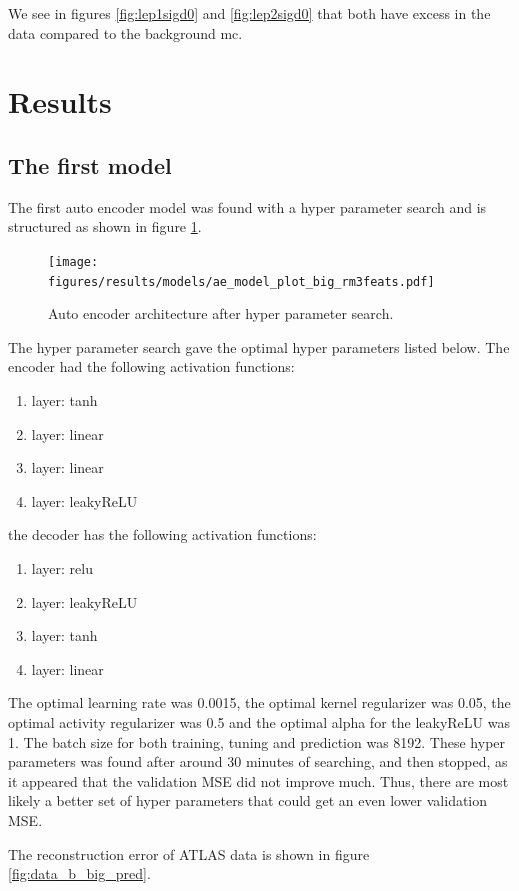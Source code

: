 \documentclass[ reprint, amsmath,amssymb, aps, nofootinbib]{revtex4-2}
\begin{document}
We see in figures \ref{fig:lep1sigd0} and \ref{fig:lep2sigd0} that both have excess in the data compared to the background mc. 

\newpage
\section{Results}

\subsection{The first model}

The first auto encoder model was found with a hyper parameter search and is structured as shown in figure \ref{fig:big_ae_plot}. 

\begin{figure}[H]
    \centering
    \texttt{[image: figures/results/models/ae\_model\_plot\_big\_rm3feats.pdf]}
    \caption{Auto encoder architecture after hyper parameter search. }
    \label{fig:big_ae_plot}
\end{figure}
The hyper parameter search gave the optimal hyper parameters listed below. The encoder had the following activation functions:
\begin{enumerate}
    \item layer: tanh
    \item layer: linear
    \item layer: linear
    \item layer: leakyReLU
\end{enumerate}

the decoder has the following activation functions: 
\begin{enumerate}
    \item layer: relu
    \item layer: leakyReLU
    \item layer: tanh
    \item layer: linear
\end{enumerate}


The optimal learning rate was 0.0015, the optimal kernel regularizer was 0.05, the optimal activity regularizer was 0.5 and the optimal alpha for the leakyReLU was 1. The batch size for both training, tuning and prediction was 8192. These hyper parameters was found after around 30 minutes of searching, and then stopped, as it appeared that the validation MSE did not improve much. Thus, there are most likely a better set of hyper parameters that could get an even lower validation MSE. \par 
The reconstruction error of ATLAS data is shown in figure \ref{fig:data_b_big_pred}.
\end{document}
